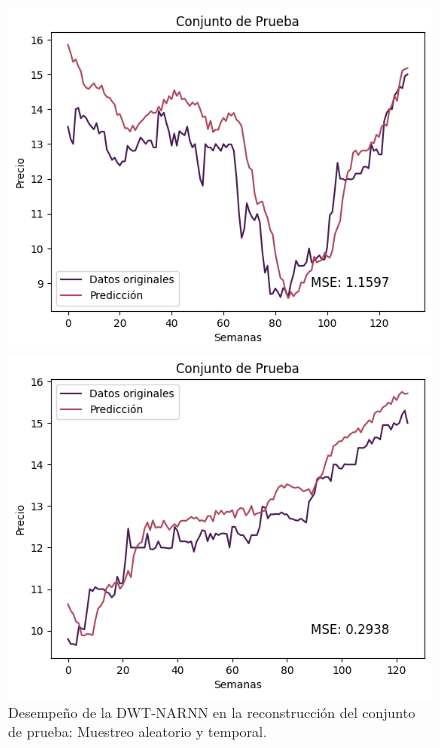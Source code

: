 \begin{figure}[H]
    \begin{minipage}{0.5\textwidth}
        \centering
        \includegraphics[width=\linewidth]{Figuras/proceso_de_entrenamiento/grafs_c_prueba/muestreo_aleatorio/DWT_NARNN/estandar/DWT_NARNN_rec.png}
    \end{minipage}
    \begin{minipage}{0.5\textwidth}
        \centering
        \includegraphics[width=\linewidth]{Figuras/proceso_de_entrenamiento/grafs_c_prueba/DWT_NARNN/estandar/DWT_NARNN_rec.png}
    \end{minipage}
    \caption{Desempeño de la DWT-NARNN en la reconstrucción del conjunto de prueba: Muestreo aleatorio y temporal.} 
    \label{fig:c_prueba_DWTNARNN}
\end{figure}


